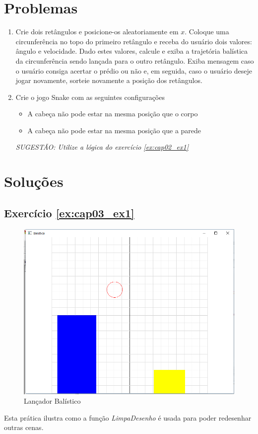 \section*{Problemas}
\begin{enumerate}
\item
  Crie dois retângulos e posicione-os aleatoriamente em $x$. Coloque uma circunferência no topo do primeiro retângulo e receba do usuário dois valores: ângulo e velocidade. Dado estes valores, calcule e exiba a trajetória balística da circunferência sendo lançada para o outro retângulo. Exiba mensagem caso o usuário consiga acertar o prédio ou não e, em seguida, caso o usuário deseje jogar novamente, sorteie novamente a posição dos retângulos.

  \label{ex:cap03_ex1}
  
\item
  Crie o jogo Snake com as seguintes configurações
  \begin{itemize}
  \item
    A cabeça não pode estar na mesma posição que o corpo
  \item
    A cabeça não pode estar na mesma posição que a parede
  \end{itemize}
  \emph{SUGESTÃO: Utilize a lógica do exercício \ref{ex:cap02_ex1} }

  \label{ex:cap03_ex2}

\end{enumerate}

\section*{Soluções}

\subsection*{Exercício \ref{ex:cap03_ex1} }
\begin{figure}[ht]
  \centerline{\includegraphics[width=.5\textwidth]{img/cap3_ex12.png}}
  \caption{Lançador Balístico}
  \label{fig:cap03_ex2}
\end{figure}
Esta prática ilustra como a função \emph{LimpaDesenho} é usada para poder redesenhar outras cenas.


